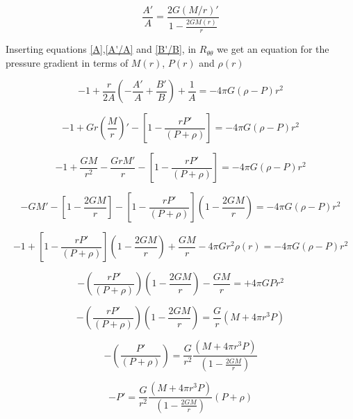 \begin{equation}\label{A'/A}
\frac{A'}{A} = \frac{2G(M/r)'}{1-\frac{2GM(r)}{r}}
\end{equation}


Inserting equations \ref{A},\ref{A'/A} and \ref{B'/B}, in  $R_{\theta \theta}$ we get an equation for the pressure gradient in terms of $M(r)$, $P(r)$ and $\rho(r)$

\begin{equation}
-1 + \frac{r}{2A} \left( -\frac{A'}{A} + \frac{B'}{B} \right) + \frac{1}{A} = -4\pi G(\rho - P) r^2
\end{equation}

\begin{equation}
-1 + Gr \left( \frac{M}{r}\right)' - \left[ 1-\frac{rP'}{(P+\rho)} \right] = -4\pi G(\rho - P) r^2
\end{equation}

\begin{equation}
-1 + \frac{GM}{r^2} -\frac{GrM'}{r} - \left[ 1-\frac{rP'}{(P+\rho)} \right] = -4\pi G(\rho - P) r^2
\end{equation}

\begin{equation}
-GM' - \left[ 1 - \frac{2GM}{r}\right] - \left[ 1-\frac{rP'}{(P+\rho)} \right]\left(  1 - \frac{2GM}{r} \right) = -4\pi G(\rho - P) r^2
\end{equation}

\begin{equation}
-1 + \left[ 1-\frac{rP'}{(P+\rho)} \right]\left(  1 - \frac{2GM}{r} \right)+\frac{GM}{r} - 4\pi G r^2 \rho(r) = -4\pi G(\rho - P) r^2
\end{equation}

\begin{equation}
- \left( \frac{rP'}{(P+\rho)}\right)\left(  1 - \frac{2GM}{r} \right) - \frac{GM}{r} = + 4\pi G P r^2
\end{equation}

\begin{equation}
- \left( \frac{rP'}{(P+\rho)}\right)\left(  1 - \frac{2GM}{r} \right) = \frac{G}{r} \left( M + 4\pi r^3 P \right)
\end{equation}

\begin{equation}
- \left( \frac{P'}{(P+\rho)}\right) = \frac{G}{r^2} \frac{\left( M + 4\pi r^3 P \right)}{\left(  1 - \frac{2GM}{r} \right)}
\end{equation}

\begin{equation}
- P' = \frac{G}{r^2} \frac{\left( M + 4\pi r^3 P \right)}{\left(  1 - \frac{2GM}{r} \right)} (P+\rho)
\end{equation}

